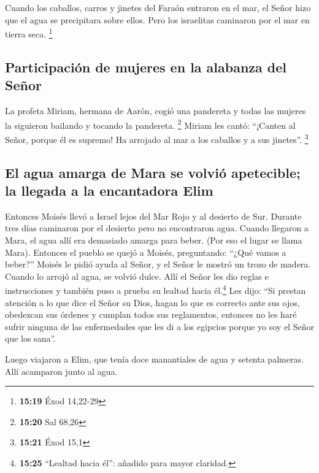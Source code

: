  Cuando los caballos, carros y jinetes del Faraón
entraron en el mar, el Señor hizo que el agua se precipitara sobre
ellos. Pero los israelitas caminaron por el mar en tierra seca.
\footnote{\textbf{15:19} Éxod 14,22-29}

\hypertarget{participaciuxf3n-de-mujeres-en-la-alabanza-del-seuxf1or}{%
\subsection{Participación de mujeres en la alabanza del
Señor}\label{participaciuxf3n-de-mujeres-en-la-alabanza-del-seuxf1or}}

 La profeta Miriam, hermana de Aarón, cogió una pandereta
y todas las mujeres la siguieron bailando y tocando la pandereta.
\footnote{\textbf{15:20} Sal 68,26}  Miriam les cantó:
``¡Canten al Señor, porque él es supremo! Ha arrojado al mar a los
caballos y a sus jinetes''. \footnote{\textbf{15:21} Éxod 15,1}

\hypertarget{el-agua-amarga-de-mara-se-volviuxf3-apetecible-la-llegada-a-la-encantadora-elim}{%
\subsection{El agua amarga de Mara se volvió apetecible; la llegada a la
encantadora
Elim}\label{el-agua-amarga-de-mara-se-volviuxf3-apetecible-la-llegada-a-la-encantadora-elim}}

 Entonces Moisés llevó a Israel lejos del Mar Rojo y al
desierto de Sur. Durante tres días caminaron por el desierto pero no
encontraron agua.  Cuando llegaron a Mara, el agua allí
era demasiado amarga para beber. (Por eso el lugar se llama Mara).
 Entonces el pueblo se quejó a Moisés, preguntando:
``¿Qué vamos a beber?''  Moisés le pidió ayuda al Señor,
y el Señor le mostró un trozo de madera. Cuando lo arrojó al agua, se
volvió dulce. Allí el Señor les dio reglas e instrucciones y también
puso a prueba su lealtad hacia él.\footnote{\textbf{15:25} ``Lealtad
  hacia él'': añadido para mayor claridad.}  Les dijo:
``Si prestan atención a lo que dice el Señor su Dios, hagan lo que es
correcto ante sus ojos, obedezcan sus órdenes y cumplan todos sus
reglamentos, entonces no les haré sufrir ninguna de las enfermedades que
les di a los egipcios porque yo soy el Señor que los sana''.

 Luego viajaron a Elim, que tenía doce manantiales de
agua y setenta palmeras. Allí acamparon junto al agua.

